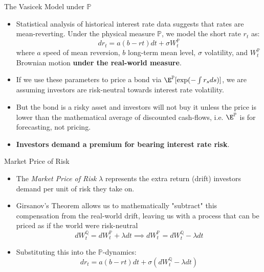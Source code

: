 \documentclass{beamer}
\begin{document}
\begin{frame}{The Vasicek Model under $\mathbb{P}$ }
	\begin{itemize}
		\item Statistical analysis of historical interest rate data suggests that rates are mean-reverting. Under the physical measure $\mathbb{P}$, we model the short rate $r_t$ as:
		\begin{equation*}
		dr_t = a(b-rt)dt + \sigma W_t^\mathbb{P}
		\end{equation*}
		where $a$ speed of mean reversion, $b$ long-term mean level, $\sigma$ volatility, and $W_t^\mathbb{P}$ Brownian motion \textbf{under the real-world measure}.
		\item If we use these parameters to price a bond via $\E^\mathbb{P}[\exp(-\int r_s ds)]$, we are assuming investors are risk-neutral towards interest rate volatility.
		\item But the bond is a risky asset and investors will not buy it unless the price is lower than the mathematical average of discounted cash-flows, i.e. $\E^\mathbb{P}$ is for forecasting, not pricing.
		\item \textbf{Investors demand a premium for bearing interest rate risk}.
	\end{itemize}
\end{frame}

\begin{frame}{Market Price of Risk}
	\begin{itemize}
		\item The \emph{Market Price of Risk} $\lambda$ represents the extra return (drift) investors demand per unit of risk they take on.
		\item Girsanov’s Theorem allows us to mathematically "subtract" this compensation from the real-world drift, leaving us with a process that can be priced as if the world were risk-neutral
		\begin{equation*}
			dW_t^\mathbb{Q} = dW_t^\mathbb{P} + \lambda dt \implies dW_t^\mathbb{P} = dW_t^\mathbb{Q} - \lambda dt
		\end{equation*}
		\item Substituting this into the $\mathbb{P}$-dynamics:
		\begin{equation*}
			dr_t = a(b-rt)dt + \sigma(dW_t^\mathbb{Q}-\lambda dt)
		\end{equation*}

	\end{itemize}
\end{frame}
\end{document}

